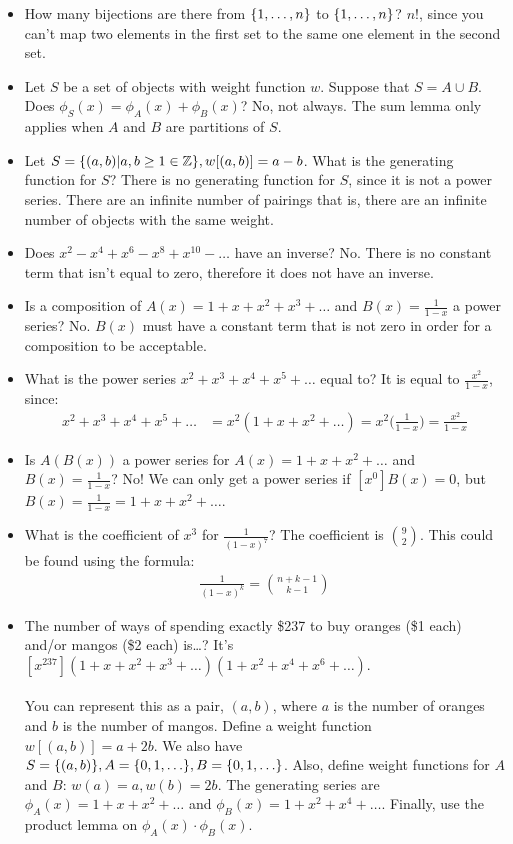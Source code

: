 \documentclass[]{article}
\theoremstyle{definition}
\newcommand{\union}{\cup}
\newcommand{\lecture}[1]{\marginpar{{\footnotesize $\leftarrow$ \underline{#1}}}}
\DeclarePairedDelimiter{\set}{\lbrace}{\rbrace}
\begin{document}
		\begin{itemize}
			\item \lecture{January 21, 2013} How many bijections are there from $\set{1, \ldots, n}$ to $\set{1, \ldots, n}$? $n!$, since you can't map two elements in the first set to the same one element in the second set.
			\item Let $S$ be a set of objects with weight function $w$. Suppose that $S = A \union B$. Does $\phi_S(x) = \phi_A(x) + \phi_B(x)$? No, not always. The sum lemma only applies when $A$ and $B$ are partitions of $S$.
			\item Let $S = \set{(a, b) | a, b \ge 1 \in \mathbb{Z}}, w[(a, b)] = a - b$. What is the generating function for $S$? There is no generating function for $S$, since it is not a power series. There are an infinite number of pairings \textendash{} that is, there are an infinite number of objects with the same weight.
			\item Does $x^2 - x^4 + x^6 - x^8 + x^10 - \ldots$ have an inverse? No. There is no constant term that isn't equal to zero, therefore it does not have an inverse.
			\item Is a composition of $A(x) = 1 + x + x^2 + x^3 + \ldots$ and $B(x) = \frac{1}{1 - x}$ a power series? No. $B(x)$ must have a constant term that is not zero in order for a composition to be acceptable.
			\item \lecture{January 30, 2013} What is the power series $x^2 + x^3 + x^4 + x^5 + \ldots$ equal to? It is equal to $\frac{x^2}{1 - x}$, since:
				\begin{align*}
					x^2 + x^3 + x^4 + x^5 + \ldots &= x^2(1 + x + x^2 + \ldots) = x^2 \bigg(\frac{1}{1 - x}\bigg) = \frac{x^2}{1 - x}
				\end{align*}
			\item Is $A(B(x))$ a power series for $A(x) = 1 + x + x^2 + \ldots$ and $B(x) = \frac{1}{1 - x}$? No! We can only get a power series if $[x^0]B(x) = 0$, but $B(x) = \frac{1}{1 - x} = 1 + x + x^2 + \ldots$.
			\item What is the coefficient of $x^3$ for $\frac{1}{(1 - x)^7}$? The coefficient is $\binom{9}{2}$. This could be found using the formula:
				\begin{align*}
					[x^n] \frac{1}{(1 - x)^k} = \binom{n + k - 1}{k - 1}
				\end{align*}
			\item The number of ways of spending exactly \$237 to buy oranges (\$1 each) and/or mangos (\$2 each) is\dots? It's $[x^{237}](1 + x + x^2 + x^3 + \ldots)(1 + x^2 + x^4 + x^6 + \ldots)$.
				\\ \\
				You can represent this as a pair, $(a, b)$, where $a$ is the number of oranges and $b$ is the number of mangos. Define a weight function $w[(a, b)] = a + 2b$. We also have $S = \set{(a, b) }, A = \set{0, 1, \ldots }, B = \set{0, 1, \ldots }$. Also, define weight functions for $A$ and $B$: $w(a) = a, w(b) = 2b$. The generating series are $\phi_A(x) = 1 + x + x^2 + \ldots$ and $\phi_B(x) = 1 + x^2 + x^4 + \ldots$. Finally, use the product lemma on $\phi_A(x) \cdot \phi_B(x)$.


\end{itemize}
\end{document}
